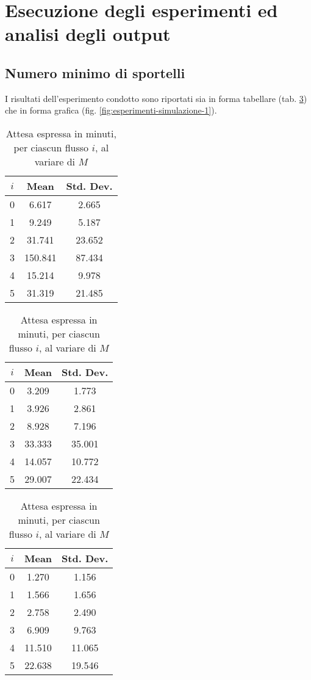 \section{Esecuzione degli esperimenti ed analisi degli output}
\subsection*{Numero minimo di sportelli}
I risultati dell'esperimento condotto sono riportati sia in forma tabellare (tab. \ref{table:esperimenti-simulazione-1}) che in forma grafica (fig. \ref{fig:esperimenti-simulazione-1}).

\begin{table}[ht]
\centering
\begin{subtable}{0.33\textwidth}
\centering
{\tablecolors
\begin{tabular}{|c|c|c|}
\hline
$i$ & Mean & Std. Dev. \\
\hline
0 & 6.617 & 2.665 \\
\hline
1 & 9.249 & 5.187 \\
\hline
2 & 31.741 & 23.652 \\
\hline
3 & {\color{red}150.841} & 87.434 \\
\hline
4 & 15.214 & 9.978 \\
\hline
5 & 31.319 & 21.485 \\
\hline
\end{tabular}}
\caption{$M = 3$}
\label{table:esperimenti-simulazione-1a}
\end{subtable}%
\begin{subtable}{0.33\textwidth}
\centering
{\tablecolors
\begin{tabular}{|c|c|c|}
\hline
$i$ & Mean & Std. Dev. \\
\hline
0 & 3.209 & 1.773 \\
\hline
1 & 3.926 & 2.861 \\
\hline
2 & 8.928 & 7.196 \\
\hline
3 & 33.333 & 35.001 \\
\hline
4 & 14.057 & 10.772 \\
\hline
5 & 29.007 & 22.434 \\
\hline
\end{tabular}}
\caption{$M = 4$}
\end{subtable}%
\begin{subtable}{0.33\textwidth}
\centering
{\tablecolors
\begin{tabular}{|c|c|c|}
\hline
$i$ & Mean & Std. Dev. \\
\hline
0 & 1.270 & 1.156 \\
\hline
1 & 1.566 & 1.656 \\
\hline
2 & 2.758 & 2.490 \\
\hline
3 & 6.909 & 9.763 \\
\hline
4 & 11.510 & 11.065 \\
\hline
5 & 22.638 & 19.546 \\
\hline
\end{tabular}}
\caption{$M = 5$}
\end{subtable}
\caption{Attesa espressa in minuti, per ciascun flusso $i$, al variare di $M$}
\label{table:esperimenti-simulazione-1}
\end{table}


